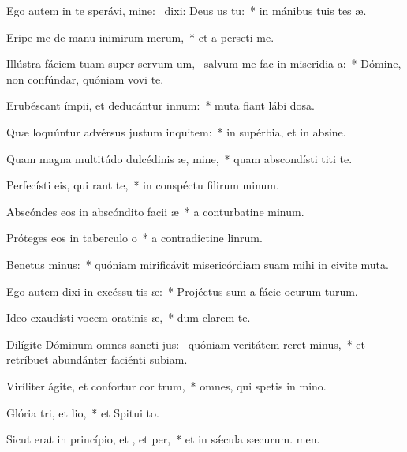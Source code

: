\item Ego autem in te sperávi, mine:~\pscross{} dixi: Deus us  tu:~* in mánibus tuis tes æ.
\item Eripe me de manu inimirum merum,~* et a perseti me.
\item Illústra fáciem tuam super servum um,~\pscross{} salvum me fac in miseridia a:~* Dómine, non confúndar, quóniam vovi te.
\item Erubéscant ímpii, et deducántur  innum:~* muta fiant lábi dosa.
\item Quæ loquúntur advérsus justum inquitem:~* in supérbia, et in absine.
\item Quam magna multitúdo dulcédinis æ, mine,~* quam abscondísti titi te.
\item Perfecísti eis, qui rant  te,~* in conspéctu filirum minum.
\item Abscóndes eos in abscóndito facii æ~* a conturbatine minum.
\item Próteges eos in taberculo o~* a contradictine linrum.
\item Benetus minus:~* quóniam mirificávit misericórdiam suam mihi in civite muta.
\item Ego autem dixi in excéssu tis æ:~* Projéctus sum a fácie ocurum turum.
\item Ideo exaudísti vocem oratinis æ,~* dum clarem  te.
\item Dilígite Dóminum omnes sancti jus:~\pscross{} quóniam veritátem reret minus,~* et retríbuet abundánter faciénti subiam.
\item Viríliter ágite, et confortur cor trum,~* omnes, qui spetis in mino.
\item Glória tri, et lio,~* et Spitui to.
\item Sicut erat in princípio, et , et per,~* et in sǽcula sæcurum. men.
